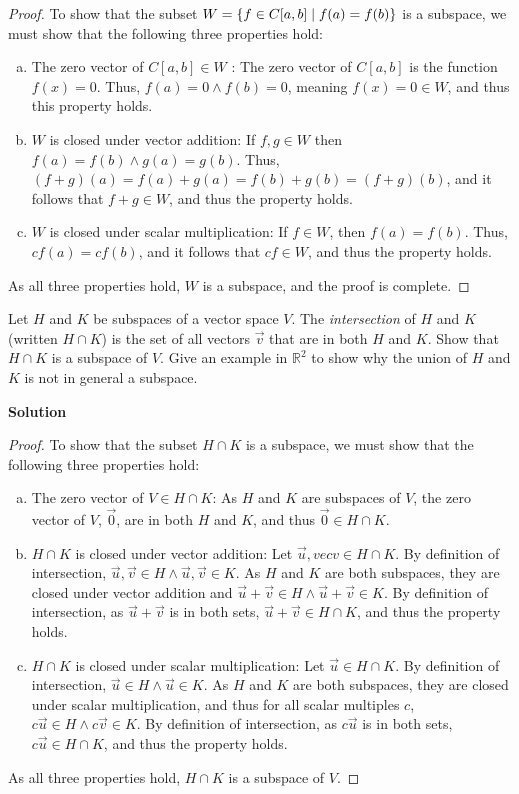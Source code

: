 \documentclass[11pt]{scrartcl}
\theoremstyle{dotlessP}
\theoremstyle{dotlessN}
\DeclarePairedDelimiter\set{\{}{\}}
\newcommand{\inter}{\cap}
\newcommand{\reals}{\mathbb{R}} %
\begin{document}
\begin{proof}
	To show that the subset $W = \set{f \in C[a,b] \mid f(a) = f(b)}$ is a subspace, we must show that the following three properties hold:
	\begin{enumerate}[a.]
		\item The zero vector of $C[a,b] \in W$ : The zero vector of $C[a,b]$ is the function $f(x) = 0$. Thus, $f(a) = 0 \land f(b) = 0$, meaning $f(x) = 0 \in W$, and thus this property holds.
		\item $W$ is closed under vector addition: If  $f, g \in W$ then $f(a) = f(b) \land g(a) = g(b)$. Thus, $(f+g)(a) = f(a) + g(a) = f(b) + g(b) = (f+g)(b)$, and it follows that $f + g \in W$, and thus the property holds.
		\item $W$ is closed under scalar multiplication: If $f \in W$, then $f(a) = f(b)$. Thus, $cf(a) = cf(b)$, and it follows that $cf \in W$, and thus the property holds.
	\end{enumerate}
	As all three properties hold, $W$ is a subspace, and the proof is complete.
\end{proof}
\begin{ques}
	Let $H$ and $K$ be subspaces of a vector space $V$. The \textit{intersection} of $H$ and $K$ (written $H \inter K$) is the set of all vectors $\vec{v}$ that are in both $H$ and $K$. Show that $H \inter K$ is a subspace of $V$. Give an example in $\reals^2$ to show why the union of $H$ and $K$ is not in general a subspace.
\end{ques}
\textbf{Solution}
\begin{proof}
	To show that the subset $H \inter K$ is a subspace, we must show that the following three properties hold:
	\begin{enumerate}[a.]
		\item The zero vector of $V \in H \inter K$: As $H$ and $K$ are subspaces of $V$, the zero vector of $V$, $\vec{0}$, are in both $H$ and $K$, and thus $\vec{0} \in H \inter K$.
		\item $H \inter K$ is closed under vector addition: Let $\vec{u}, vec{v} \in H \inter K$. By definition of intersection, $\vec{u},\vec{v} \in H \land \vec{u},\vec{v} \in K$. As $H$ and $K$ are both subspaces, they are closed under vector addition and $\vec{u} + \vec{v} \in H \land \vec{u} + \vec{v} \in K$. By definition of intersection, as $\vec{u} + \vec{v}$ is in both sets, $\vec{u} + \vec{v} \in H \inter K$, and thus the property holds.
		\item $H \inter K$ is closed under scalar multiplication: Let $\vec{u} \in H \inter K$. By definition of intersection, $\vec{u} \in H \land \vec{u} \in K$. As $H$ and $K$ are both subspaces, they are closed under scalar multiplication, and thus for all scalar multiples  $c$, $c\vec{u} \in H \land c\vec{v} \in K$. By definition of intersection, as $c\vec{u}$ is in both sets,  $c\vec{u} \in H \inter K$, and thus the property holds.
	\end{enumerate}
	As all three properties hold, $H \inter K$ is a subspace of $V$.
\end{proof}
\end{document}
